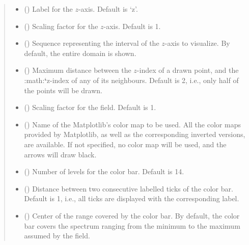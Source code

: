 \documentclass[letterpaper,10pt,english]{sphinxmanual}
\begin{document}
\begin{fulllineitems}
\begin{quote}
\begin{description}
\begin{itemize}
\item {} 
 () \textendash{} Label for the \(z\)-axis. Default is ‘z’.

\item {} 
 () \textendash{} Scaling factor for the \(z\)-axis. Default is 1.

\item {} 
 () \textendash{} Sequence representing the interval of the \(z\)-axis to visualize.
By default, the entire domain is shown.

\item {} 
 () \textendash{} Maximum distance between the \(z\)-index of a drawn point, and the :math:{\color{red}\bfseries{}{}`}z-index of any
of its neighbours. Default is 2, i.e., only half of the points will be drawn.

\item {} 
 () \textendash{} Scaling factor for the field. Default is 1.

\item {} 
 () \textendash{} Name of the Matplotlib’s color map to be used. All the color maps provided by Matplotlib,
as well as the corresponding inverted versions, are available. If not specified, no color map
will be used, and the arrows will draw black.

\item {} 
 () \textendash{} Number of levels for the color bar. Default is 14.

\item {} 
 () \textendash{} Distance between two consecutive labelled ticks of the color bar. Default is 1, i.e.,
all ticks are displayed with the corresponding label.

\item {} 
 () \textendash{} Center of the range covered by the color bar. By default, the color bar covers the spectrum
ranging from the minimum to the maximum assumed by the field.


\end{itemize}
\end{description}
\end{quote}
\end{fulllineitems}
\end{document}
